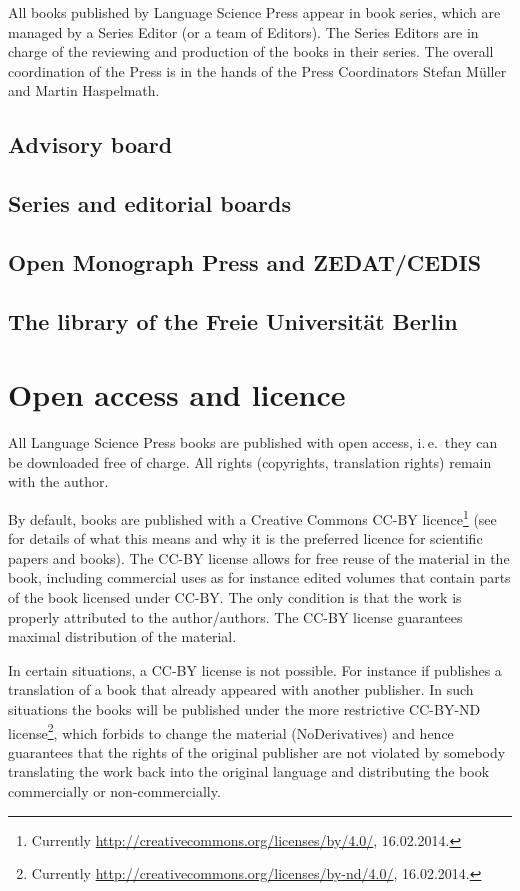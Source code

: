 All books published by Language Science Press appear in book series, which are managed by a Series
Editor (or a team of Editors). The Series Editors are in charge of the reviewing and production of
the books in their series. The overall coordination of the Press is in the hands of the Press
Coordinators Stefan Müller and Martin Haspelmath.

\subsection{Advisory board}



\subsection{Series and editorial boards}

\subsection{Open Monograph Press and ZEDAT/CEDIS}

\subsection{The library of the Freie Universität Berlin}


\section{Open access and licence}

All Language Science Press books are published with open access, i.\,e.\ they can be downloaded free of
charge. All rights (copyrights, translation rights) remain with the author. 

By default, \lsp books are published with a Creative Commons CC-BY licence\footnote{ 
  Currently \url{http://creativecommons.org/licenses/by/4.0/}, 16.02.2014.
} (see  for details
of what this means and why it is the preferred licence for scientific papers and books). The CC-BY
license allows for free reuse of the material in the book, including commercial uses as for instance
edited volumes that contain parts of the book licensed under CC-BY. The only condition is that the
work is properly attributed to the author/authors. The CC-BY license guarantees maximal distribution
of the material.

In certain situations, a CC-BY license is not possible. For instance if \lsp publishes a translation of a
book that already appeared with another publisher. In such situations the books will be published
under the more restrictive CC-BY-ND license\footnote{
Currently \url{http://creativecommons.org/licenses/by-nd/4.0/}, 16.02.2014.
}, which forbids to change the material (NoDerivatives) and hence guarantees that
the rights of the original publisher are not violated by somebody translating the work back into the
original language and distributing the book commercially or non-commercially.


